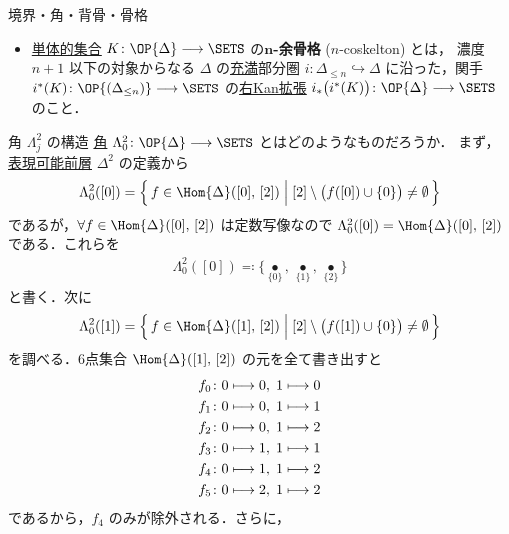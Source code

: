 \documentclass[TQFT_main]{subfiles}
\begin{document}
\begin{mydef}[label=def:horn,breakable]{境界・角・背骨・骨格}
\begin{itemize}
        \item \hyperref[def:SimpSet]{単体的集合} $K \colon \OP{\Delta} \lto \SETS$ の\textbf{$\bm{n}$-余骨格} ($n$-coskelton) とは，
        濃度 $n+1$ 以下の対象からなる $\Delta$ の\hyperref[def:faithful]{充満}部分圏 $i \colon \Delta_{\le n} \hookrightarrow \Delta$ に沿った，関手 $i^*(K) \colon \OP{(\Delta_{\le n})} \lto \SETS$ の\hyperref[def:Kanext]{右Kan拡張} $i_* \bigl(i^* (K)\bigr) \colon \OP{\Delta} \lto \SETS$ のこと．
    \end{itemize}
    
\end{mydef}

\begin{myexample}[label=ex:horn]{角 $\Lambda^2_j$ の構造}
    \hyperref[def:horn]{角} $\Lambda^2_0 \colon \OP{\Delta} \lto \SETS$ とはどのようなものだろうか．
    まず，\hyperref[def:representable]{表現可能前層} $\Delta^2$ の定義から
    \begin{align}
        \Lambda^2_0([0]) = \Bigl\{\, f \in \Hom{\Delta} ([0],\, [2]) \Bigm| [2] \setminus \bigl( f([0]) \cup \{0\}\bigr) \neq \emptyset \,\Bigr\} 
    \end{align}
    であるが，$\forall f \in \Hom{\Delta} ([0],\, [2])$ は定数写像なので $\Lambda^2_0([0]) = \Hom{\Delta} ([0],\, [2])$ である．これらを
    \begin{align}
        \Lambda^2_0 ([0]) \eqqcolon \bigl\{ \underset{\{0\}}{\bullet},\, \underset{\{1\}}{\bullet},\, \underset{\{2\}}{\bullet} \bigr\}
    \end{align}
    と書く．次に
    \begin{align}
        \Lambda^2_0([1]) = \Bigl\{\, f \in \Hom{\Delta} ([1],\, [2]) \Bigm| [2] \setminus \bigl( f([1]) \cup \{0\}\bigr) \neq \emptyset  \,\Bigr\} 
    \end{align}
    を調べる．6点集合 $\Hom{\Delta} ([1],\, [2])$ の元を全て書き出すと
    \begin{align}
        f_0 \colon 0 &\longmapsto 0,\; 1 \longmapsto 0 \\
        f_1 \colon 0 &\longmapsto 0,\; 1 \longmapsto 1 \\
        f_2 \colon 0 &\longmapsto 0,\; 1 \longmapsto 2 \\
        f_3 \colon 0 &\longmapsto 1,\; 1 \longmapsto 1 \\
        f_4 \colon 0 &\longmapsto 1,\; 1 \longmapsto 2 \\
        f_5 \colon 0 &\longmapsto 2,\; 1 \longmapsto 2
    \end{align}
    であるから，$f_4$ のみが除外される．さらに，
    \begin{align}

\end{align}
\end{myexample}
\end{document}
